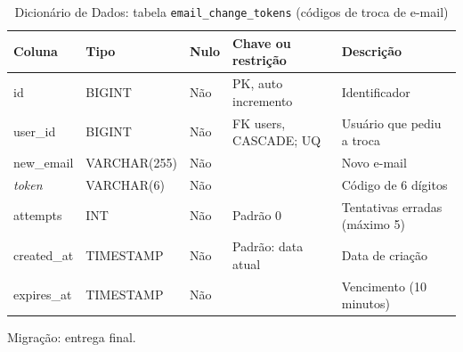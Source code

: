 \begin{table}[H]
\centering
\footnotesize
\caption{Dicionário de Dados: tabela \texttt{email\_\allowbreak{}change\_\allowbreak{}tokens} (códigos de troca de e-mail)}
\label{tab:dd-email-change-tokens}
\begin{tabular}{|>{\raggedright\arraybackslash}p{3.0cm}|>{\raggedright\arraybackslash}p{3.2cm}|>{\centering\arraybackslash}p{0.8cm}|>{\raggedright\arraybackslash}p{3.0cm}|>{\raggedright\arraybackslash}p{3.8cm}|}
\hline
\textbf{Coluna} & \textbf{Tipo} & \textbf{Nulo} & \textbf{Chave ou restrição} & \textbf{Descrição} \\
\hline
id & BIGINT & Não & PK, auto incremento & Identificador \\
\hline
user\_\allowbreak{}id & BIGINT & Não & FK users, CASCADE; UQ & Usuário que pediu a troca \\
\hline
new\_\allowbreak{}email & VARCHAR(255) & Não &  & Novo e-mail \\
\hline
\textit{token} & VARCHAR(6) & Não &  & Código de 6 dígitos \\
\hline
attempts & INT & Não & Padrão 0 & Tentativas erradas (máximo 5) \\
\hline
created\_\allowbreak{}at & TIMESTAMP & Não & Padrão: data atual & Data de criação \\
\hline
expires\_\allowbreak{}at & TIMESTAMP & Não &  & Vencimento (10 minutos) \\
\hline
\end{tabular}
\par\footnotesize Migração: entrega final.
\end{table}

